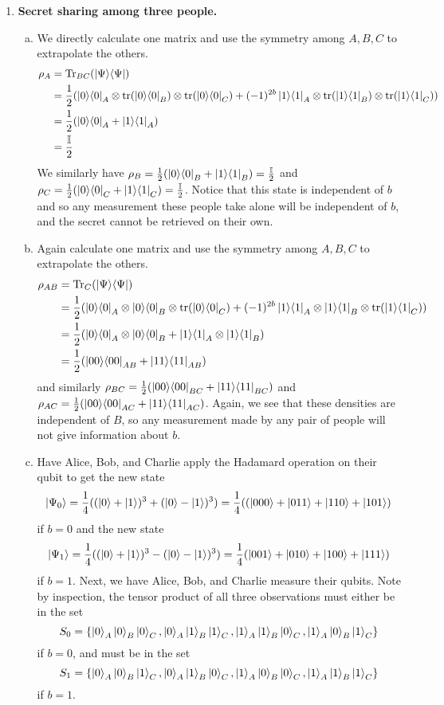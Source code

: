 \documentclass[12pt]{article}
\begin{document}
\begin{enumerate}
\item  \textbf{Secret sharing among three people.}
\begin{enumerate}[(a)]
\item We directly calculate one matrix and use the symmetry among $A,B,C$ to extrapolate the others. $$\begin{aligned}\rho_{A} & = \text{Tr}_{BC}(\ketbra{\Psi}\Psi) \\  & = \frac{1}2(\ketbra{0}0_A\otimes\text{tr}(\ketbra{0}0_B)\otimes \text{tr}(\ketbra{0}0_C) + (-1)^{2b} \ketbra{1}1_A\otimes\text{tr}(\ketbra{1}1_B)\otimes \text{tr}(\ketbra{1}1_C)) \\ & = \frac{1}2(\ketbra{0}0_A + \ketbra{1}1_A) \\ & = \frac{\mathbb{I}}2\end{aligned}$$ We similarly have $\rho_B =\frac{1}2(\ket{0}\!\bra{0}_B + \ket{1}\!\bra{1}_B) = \frac{\mathbb{I}}2$ and $\rho_C = \frac{1}2(\ket{0}\!\bra{0}_C + \ket{1}\!\bra{1}_C) = \frac{\mathbb{I}}2$. Notice that this state is independent of $b$ and so any measurement these people take alone will be independent of $b$, and the secret cannot be retrieved on their own. \\ 

\item Again calculate one matrix and use the symmetry among $A,B,C$ to extrapolate the others. $$\begin{aligned}\rho_{AB} & = \text{Tr}_{C}(\ketbra{\Psi}\Psi) \\  & = \frac{1}2(\ketbra{0}0_A\otimes\ketbra{0}0_B\otimes \text{tr}(\ketbra{0}0_C) + (-1)^{2b} \ketbra{1}1_A\otimes\ketbra{1}1_B\otimes \text{tr}(\ketbra{1}1_C)) \\ & = \frac{1}2(\ketbra{0}0_A\otimes \ketbra{0}0_B + \ketbra{1}1_A\otimes \ketbra{1}1_B) \\ & = \frac{1}2(\ketbra{00}{00}_{AB} + \ketbra{11}{11}_{AB})\end{aligned}$$ and similarly $\rho_{BC} = \frac{1}2(\ket{00}\!\bra{00}_{BC} + \ket{11}\!\bra{11}_{BC})$ and $\rho_{AC} = \frac{1}2(\ket{00}\!\bra{00}_{AC} + \ket{11}\!\bra{11}_{AC})$. Again, we see that these densities are independent of $B$, so any measurement made by any pair of people will not give information about $b$.

\item Have Alice, Bob, and Charlie apply the Hadamard operation on their qubit to get the new state $$\ket{\Psi_0} = \frac{1}4((\ket{0}+\ket{1})^3 + (\ket{0}-\ket{1})^3) = \frac{1}4((\ket{000}+\ket{011}+\ket{110}+\ket{101})$$ if $b=0$ and the new state $$ \ket{\Psi_1} = \frac{1}4((\ket{0}+\ket{1})^3 - (\ket{0} - \ket{1})^3) = \frac{1}4 (\ket{001}+\ket{010}+\ket{100}+\ket{111})$$ if $b=1$. Next, we have Alice, Bob, and Charlie measure their qubits. Note by inspection, the tensor product of all three observations must either be in the set $$S_0 = \{\ket{0}_A\ket{0}_B\ket{0}_C, \ket{0}_A\ket{1}_B\ket{1}_C,  \ket{1}_A\ket{1}_B\ket{0}_C,\ket{1}_A\ket{0}_B\ket{1}_C\}$$ if $b=0$, and must be in the set $$S_1 = \{\ket{0}_A\ket{0}_B\ket{1}_C, \ket{0}_A\ket{1}_B\ket{0}_C,  \ket{1}_A\ket{0}_B\ket{0}_C,\ket{1}_A\ket{1}_B\ket{1}_C\}$$ if $b=1$. \\ 


\end{enumerate}
\end{enumerate}
\end{document}
